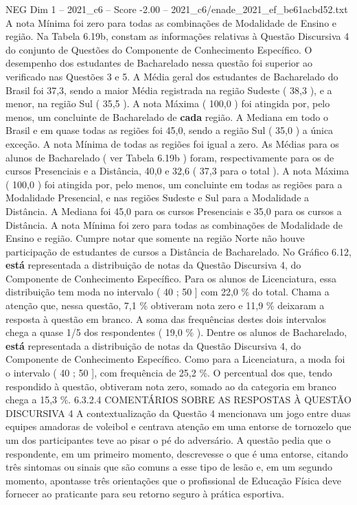 \begin{textsample}{NEG Dim 1 – 2021\_c6 – Score -2.00 – 2021\_c6/enade\_2021\_ef\_be61acbd52.txt}
A nota Mínima foi zero para todas as combinações de Modalidade de Ensino e região.
Na Tabela 6.19b, constam as informações relativas à Questão Discursiva 4 do conjunto de Questões do Componente de Conhecimento Específico.
O desempenho dos estudantes de Bacharelado nessa questão foi superior ao verificado nas Questões 3 e 5.
A Média geral dos estudantes de Bacharelado do Brasil foi 37,3, sendo a maior Média registrada na região Sudeste ( 38,3 ), e a menor, na região Sul ( 35,5 ).
A nota Máxima ( 100,0 ) foi atingida por, pelo menos, um concluinte de Bacharelado de \textbf{cada} região.
A Mediana em todo o Brasil e em quase todas as regiões foi 45,0, sendo a região Sul ( 35,0 ) a única exceção.
A nota Mínima de todas as regiões foi igual a zero.
As Médias para os alunos de Bacharelado ( ver Tabela 6.19b ) foram, respectivamente para os de cursos Presenciais e a Distância, 40,0 e 32,6 ( 37,3 para o total ).
A nota Máxima ( 100,0 ) foi atingida por, pelo menos, um concluinte em todas as regiões para a Modalidade Presencial, e nas regiões Sudeste e Sul para a Modalidade a Distância.
A Mediana foi 45,0 para os cursos Presenciais e 35,0 para os cursos a Distância.
A nota Mínima foi zero para todas as combinações de Modalidade de Ensino e região.
Cumpre notar que somente na região Norte não houve participação de estudantes de cursos a Distância de Bacharelado.
No Gráfico 6.12, \textbf{está} representada a distribuição de notas da Questão Discursiva 4, do Componente de Conhecimento Específico.
Para os alunos de Licenciatura, essa distribuição tem moda no intervalo ( 40 ; 50 ] com 22,0 \% do total.
Chama a atenção que, nessa questão, 7,1 \% obtiveram nota zero e 11,9 \% deixaram a resposta à questão em branco.
A soma das frequências destes dois intervalos chega a quase 1/5 dos respondentes ( 19,0 \% ).
Dentre os alunos de Bacharelado, \textbf{está} representada a distribuição de notas da Questão Discursiva 4, do Componente de Conhecimento Específico.
Como para a Licenciatura, a moda foi o intervalo ( 40 ; 50 ], com frequência de 25,2 \%.
O percentual dos que, tendo respondido à questão, obtiveram nota zero, somado ao da categoria em branco chega a 15,3 \%. 6.3.2.4 COMENTÁRIOS SOBRE AS RESPOSTAS À QUESTÃO DISCURSIVA 4 A contextualização da Questão 4 mencionava um jogo entre duas equipes amadoras de voleibol e centrava atenção em uma entorse de tornozelo que um dos participantes teve ao pisar o pé do adversário.
A questão pedia que o respondente, em um primeiro momento, descrevesse o que é uma entorse, citando três sintomas ou sinais que são comuns a esse tipo de lesão e, em um segundo momento, apontasse três orientações que o profissional de Educação Física deve fornecer ao praticante para seu retorno seguro à prática esportiva.

\end{textsample}
